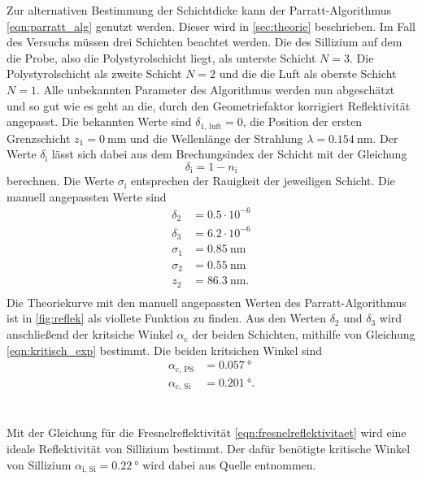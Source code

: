 Zur alternativen Bestimmung der Schichtdicke kann der Parratt-Algorithmus \eqref{eqn:parratt_alg} genutzt werden.
Dieser wird in \autoref{sec:theorie} beschrieben.
Im Fall des Versuchs müssen drei Schichten beachtet werden.
Die des Sillizium auf dem die Probe, also die Polystyrolschicht liegt, als unterste Schicht $N=3$.
Die Polystyrolschicht als zweite Schicht $N=2$ und die die Luft als oberste Schicht $N=1$.
Alle unbekannten Parameter des Algorithmus werden nun abgeschätzt und so gut wie es geht an die, durch den Geometriefaktor korrigiert Reflektivität angepasst.
Die bekannten Werte sind $\delta_\text{1, luft} = 0$, die Position der ersten Grenzschicht $z_1= \SI{0}{\milli\meter}$ und die Wellenlänge der Strahlung $\lambda =\SI{0.154}{\nano\meter}$.
Der Werte $\delta_\text{i}$ lässt sich dabei aus dem Brechungsindex der Schicht mit der Gleichung
\begin{equation}
    \delta_\text{i} = 1- n_\text{i}
\end{equation}
berechnen.
Die Werte $\sigma_\text{i}$ entsprechen der Rauigkeit der jeweiligen Schicht.
Die manuell angepassten Werte sind
\begin{align*}
    \delta_2 &= 0.5\cdot10^{-6}        \\ 
    \delta_3 &= 6.2\cdot10^{-6}        \\ 
    \sigma_1 &= \SI{0.85}{\nano\meter} \\ 
    \sigma_2 &= \SI{0.55}{\nano\meter} \\ 
    z_2 &= \SI{86.3}{\nano\meter}.  \\
\end{align*}
Die Theoriekurve mit den manuell angepassten Werten des Parratt-Algorithmus ist in \autoref{fig:reflek} als viollete Funktion zu finden.
Aus den Werten $\delta_2$ und $\delta_3$ wird anschließend der kritsiche Winkel $\alpha_\text{c}$ der beiden Schichten, mithilfe von Gleichung \eqref{eqn:kritisch_exp} bestimmt.
Die beiden kritsichen Winkel sind 
\begin{align*}
    \alpha_\text{c, PS} &= \SI{0.057}{\degree}\\
    \alpha_\text{c, Si} &= \SI{0.201}{\degree}.
\end{align*}
\\\\
Mit der Gleichung für die Fresnelreflektivität \eqref{eqn:fresnelreflektivitaet} wird eine ideale Reflektivität von Sillizium bestimmt.
Der dafür benötigte kritische Winkel von Sillizium $\alpha_\text{i, Si} = \SI{0.22}{\degree}$ wird dabei aus Quelle \cite[8]{alte_anleitung} entnommen.
